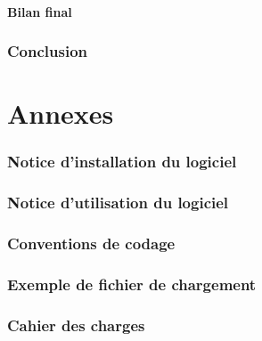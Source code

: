\documentclass[paper=a4, fontsize=12pt]{article}
\newenvironment{changemargin}[2]{\begin{list}{}{%
      \setlength{\topsep}{0pt}%
      \setlength{\leftmargin}{0pt}%
      \setlength{\rightmargin}{0pt}%
      \setlength{\listparindent}{\parindent}%
      \setlength{\itemindent}{\parindent}%
      \setlength{\parsep}{0pt plus 1pt}%
      \addtolength{\leftmargin}{#1}%
      \addtolength{\rightmargin}{#2}%
    }\item }{\end{list}}
\numberwithin{equation}{section}		%
\numberwithin{figure}{section}			%
\numberwithin{table}{section}				%
\begin{document}
\begin{changemargin}{-1cm}{-1cm}
  \subsection{Bilan final}
  
  \newpage

  \section{Conclusion}
  
  \newpage

  
  

  \appendix
  \part*{Annexes}
  \section{Notice d'installation du logiciel}%
  \newpage 
  \section{Notice d'utilisation du logiciel}%
   
  \newpage
  \section{Conventions de codage}%
  \newpage 
  \section{Exemple de fichier de chargement}
    
  \newpage
  \section{Cahier des charges}
    
  \newpage
  

  


\end{changemargin}

\end{document}
